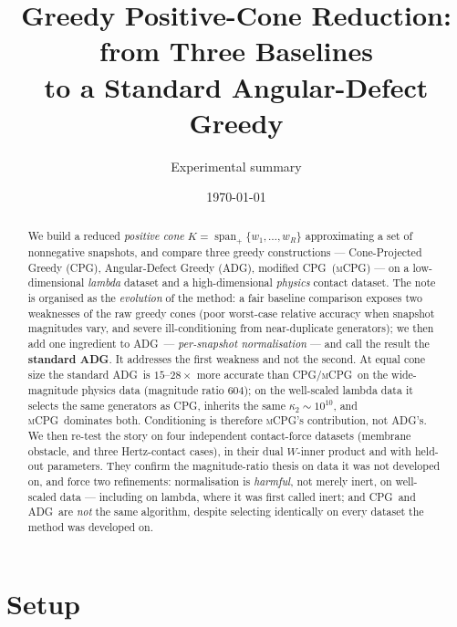 \documentclass[11pt]{article}
\title{Greedy Positive-Cone Reduction: from Three Baselines\\
       to a Standard Angular-Defect Greedy}
\author{Experimental summary}
\date{\today}
\newcommand{\CPG}{\textsc{CPG}}
\newcommand{\ADG}{\textsc{ADG}}
\newcommand{\mCPG}{\textsc{mCPG}}
\begin{document}
\maketitle

\begin{abstract}
We build a reduced \emph{positive cone}
$K=\operatorname{span}_+\{w_1,\dots,w_R\}$ approximating a set of nonnegative
snapshots, and compare three greedy constructions --- Cone-Projected Greedy
(\CPG), Angular-Defect Greedy (\ADG), modified \CPG\ (\mCPG) --- on a
low-dimensional \emph{lambda} dataset and a high-dimensional \emph{physics}
contact dataset. The note is organised as the \emph{evolution} of the method: a
fair baseline comparison exposes two weaknesses of the raw greedy cones (poor
worst-case relative accuracy when snapshot magnitudes vary, and severe
ill-conditioning from near-duplicate generators); we then add one ingredient to
\ADG\ --- \emph{per-snapshot normalisation} --- and call the result the
\textbf{standard \ADG}. It addresses the first weakness and not the second. At
equal cone size the standard \ADG\ is $15$--$28\times$ more accurate than
\CPG/\mCPG\ on the wide-magnitude physics data (magnitude ratio $604$); on the
well-scaled lambda data it selects the same generators as \CPG, inherits the same
$\kappa_2\sim10^{10}$, and \mCPG\ dominates both. Conditioning is therefore
\mCPG's contribution, not \ADG's. We then re-test the story on four independent
contact-force datasets (membrane obstacle, and three Hertz-contact cases), in
their dual $W$-inner product and with held-out parameters. They confirm the
magnitude-ratio thesis on data it was not developed on, and force two
refinements: normalisation is \emph{harmful}, not merely inert, on well-scaled
data --- including on lambda, where it was first called inert; and \CPG\ and
\ADG\ are \emph{not} the same algorithm, despite selecting identically on every
dataset the method was developed on.
\end{abstract}

\section{Setup}
\end{document}

